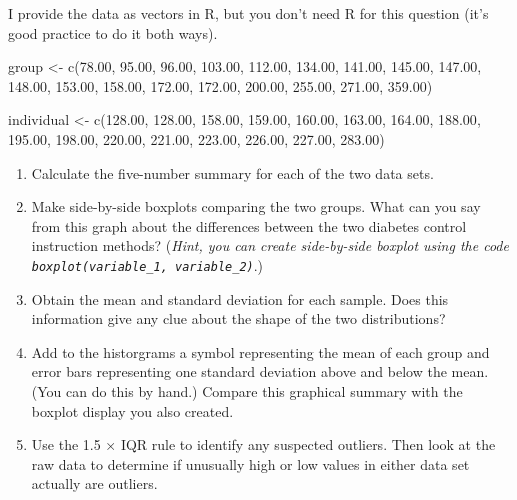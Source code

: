 \documentclass[
  letterpaper,
  DIV=11,
  numbers=noendperiod,
  oneside]{scrreprt}
\newenvironment{Shaded}{\begin{snugshade}}{\end{snugshade}}
\newcommand{\FloatTok}[1]{\textcolor[rgb]{0.68,0.00,0.00}{#1}}
\newcommand{\FunctionTok}[1]{\textcolor[rgb]{0.28,0.35,0.67}{#1}}
\newcommand{\NormalTok}[1]{\textcolor[rgb]{0.00,0.23,0.31}{#1}}
\newcommand{\OtherTok}[1]{\textcolor[rgb]{0.00,0.23,0.31}{#1}}
\providecommand{\tightlist}{%
  \setlength{\itemsep}{0pt}\setlength{\parskip}{0pt}}\usepackage{longtable,booktabs,array}
\begin{document}
I provide the data as vectors in R, but you don't need R for this
question (it's good practice to do it both ways).

\begin{Shaded}
\begin{Highlighting}[]
\NormalTok{group }\OtherTok{\textless{}{-}} \FunctionTok{c}\NormalTok{(}\FloatTok{78.00}\NormalTok{, }\FloatTok{95.00}\NormalTok{, }\FloatTok{96.00}\NormalTok{, }\FloatTok{103.00}\NormalTok{, }\FloatTok{112.00}\NormalTok{, }\FloatTok{134.00}\NormalTok{, }\FloatTok{141.00}\NormalTok{, }\FloatTok{145.00}\NormalTok{, }\FloatTok{147.00}\NormalTok{,}
    \FloatTok{148.00}\NormalTok{, }\FloatTok{153.00}\NormalTok{, }\FloatTok{158.00}\NormalTok{, }\FloatTok{172.00}\NormalTok{, }\FloatTok{172.00}\NormalTok{, }\FloatTok{200.00}\NormalTok{, }\FloatTok{255.00}\NormalTok{, }\FloatTok{271.00}\NormalTok{, }\FloatTok{359.00}\NormalTok{)}

\NormalTok{individual }\OtherTok{\textless{}{-}} \FunctionTok{c}\NormalTok{(}\FloatTok{128.00}\NormalTok{, }\FloatTok{128.00}\NormalTok{, }\FloatTok{158.00}\NormalTok{, }\FloatTok{159.00}\NormalTok{, }\FloatTok{160.00}\NormalTok{, }\FloatTok{163.00}\NormalTok{, }\FloatTok{164.00}\NormalTok{, }\FloatTok{188.00}\NormalTok{, }\FloatTok{195.00}\NormalTok{,}
    \FloatTok{198.00}\NormalTok{, }\FloatTok{220.00}\NormalTok{, }\FloatTok{221.00}\NormalTok{, }\FloatTok{223.00}\NormalTok{, }\FloatTok{226.00}\NormalTok{, }\FloatTok{227.00}\NormalTok{, }\FloatTok{283.00}\NormalTok{)}
\end{Highlighting}
\end{Shaded}

\begin{enumerate}
\def\labelenumi{\alph{enumi}.}
\tightlist
\item
  Calculate the five-number summary for each of the two data sets.
\item
  Make side-by-side boxplots comparing the two groups. What can you say
  from this graph about the differences between the two diabetes control
  instruction methods? (\emph{Hint, you can create side-by-side boxplot
  using the code \texttt{boxplot(variable\_1,\ variable\_2)}}.)
\item
  Obtain the mean and standard deviation for each sample. Does this
  information give any clue about the shape of the two distributions?
\item
  Add to the historgrams a symbol representing the mean of each group
  and error bars representing one standard deviation above and below the
  mean. (You can do this by hand.) Compare this graphical summary with
  the boxplot display you also created.
\item
  Use the 1.5 × IQR rule to identify any suspected outliers. Then look
  at the raw data to determine if unusually high or low values in either
  data set actually are outliers.
\end{enumerate}
\end{document}
